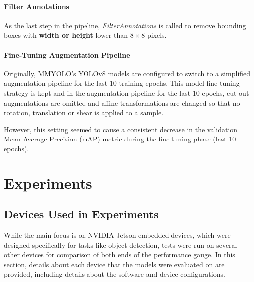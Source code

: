 \subsubsection*{Filter Annotations}

As the last step in the pipeline, \textit{FilterAnnotations} is called to remove
bounding boxes with \textbf{width or height} lower than $8 \times 8$ pixels.


\subsubsection{Fine-Tuning Augmentation Pipeline}

Originally, MMYOLO's YOLOv8 models are configured to switch to a simplified
augmentation pipeline for the last 10 training epochs. This model fine-tuning
strategy is kept and in the augmentation pipeline for the last 10 epochs,
cut-out augmentations are omitted and affine transformations are changed so that
no rotation, translation or shear is applied to a sample.

However, this setting seemed to cause a consistent decrease in the validation
Mean Average Precision (mAP) metric during the fine-tuning phase (last 10
epochs).







\chapter{Experiments}



\section{Devices Used in Experiments}


While the main focus is on NVIDIA Jetson embedded devices, which were designed
specifically for tasks like object detection, tests were run on several other
devices for comparison of both ends of the performance gauge. In this section,
details about each device that the models were evaluated on are provided,
including details about the software and device configurations.



